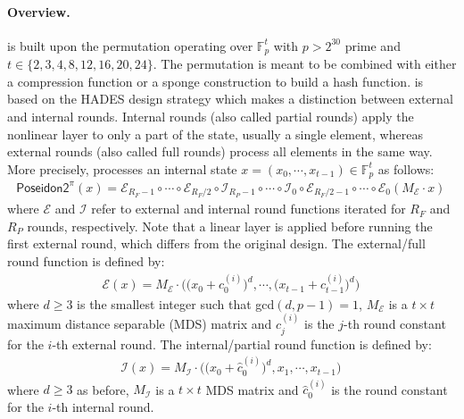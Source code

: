 \paragraph{Overview.}
\PoseidonTwo is built upon the \PoseidonTwoPi permutation operating over $\mathbb{F}_p^t$ with $p > 2^{30}$ prime and $t \in \{2,3,4,8,12,16,20,24\}$.
The permutation is meant to be combined with either a compression function or a sponge construction to build a hash function.
\PoseidonTwoPi is based on the HADES design strategy which makes a distinction between external and internal rounds.
Internal rounds (also called partial rounds) apply the nonlinear layer to only a part of the state, usually a single element, whereas external rounds (also called full rounds) process all elements in the same way.
More precisely, \PoseidonTwoPi processes an internal state $x = (x_0,\cdots,x_{t-1}) \in \mathbb{F}_p^t$ as follows:
\begin{align*}
 \mathsf{Poseidon2}^{\pi}(x) = \mathcal{E}_{R_F-1} \circ \cdots \circ \mathcal{E}_{R_F/2} \circ \mathcal{I}_{R_P-1} \circ \cdots \circ \mathcal{I}_{0}\circ \mathcal{E}_{R_F/2-1} \circ \cdots \circ \mathcal{E}_{0}(M_{\mathcal{E}} \cdot x) \,
\end{align*}
where $\mathcal{E}$ and $\mathcal{I}$ refer to external and internal round functions iterated for $R_F$ and $R_P$ rounds, respectively.
Note that a linear layer is applied before running the first external round, which differs from the original \PoseidonPi design.
The external/full round function is defined by:
\begin{align*}
 \mathcal{E}(x) = M_{\mathcal{E}} \cdot \Big(\big(x_0+c_0^{(i)}\big)^d,\cdots,\big(x_{t-1}+c_{t-1}^{(i)}\big)^d\Big) \,
\end{align*}
where $d \geq 3$ is the smallest integer such that gcd$(d,p-1) = 1$, $M_{\mathcal{E}}$ is a $t \times t$ maximum distance separable (MDS) matrix and $c_j^{(i)}$ is the $j$-th round constant for the $i$-th external round.
The internal/partial round function is defined by:
\begin{align*}
 \mathcal{I}(x) = M_{\mathcal{I}} \cdot \Big(\big(x_0+\hat{c}_0^{(i)}\big)^d,x_1,\cdots,x_{t-1}\Big) \,
\end{align*}
where $d \geq 3$ as before, $M_{\mathcal{I}}$ is a $t \times t$ MDS matrix and $\hat{c}_0^{(i)}$ is the round constant for the $i$-th internal round.


